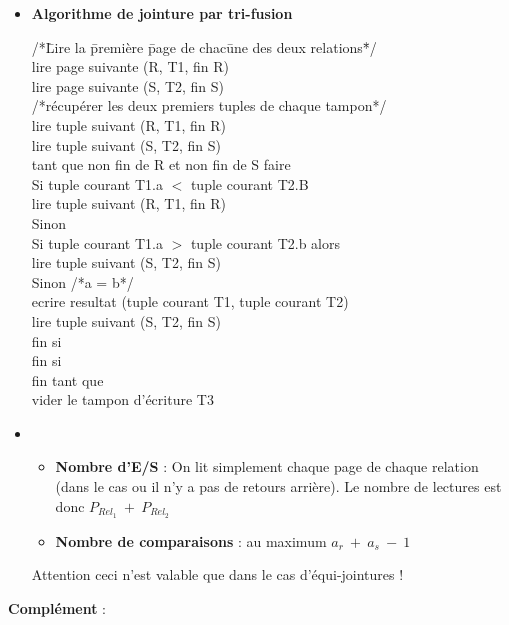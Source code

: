 \documentclass[11pt]{article}
\begin{document}
\begin{itemize}
\item \textbf{Algorithme de jointure par tri-fusion}
\begin{tabbing}
/*\=Lire la \= première \= page de chac\=une des deux relations\=*/\\
\>lire page suivante (R, T1, fin R)\\
\>lire page suivante (S, T2, fin S)\\
/*récupérer les deux premiers tuples de chaque tampon*/\\
\>lire tuple suivant (R, T1, fin R)\\
\>lire tuple suivant (S, T2, fin S)\\
\>tant que non fin de R et non fin de S faire\\
\>\>Si tuple courant T1.a $<$ tuple courant T2.B\\
\>\>\>lire tuple suivant (R, T1, fin R)\\
\>\>Sinon \\
\>\>\>Si tuple courant T1.a $>$ tuple courant T2.b alors\\
\>\>\>\>lire tuple suivant (S, T2, fin S)\\
\>\>\>Sinon /*a = b*/\\
\>\>\>\>ecrire resultat (tuple courant T1, tuple courant T2)\\
\>\>\>\>lire tuple suivant (S, T2, fin S)\\
\>\>\>fin si\\
\>\>fin si\\
\>fin tant que\\
\>vider le tampon d'écriture T3
\end{tabbing}
\item \begin{itemize} \item \textbf{Nombre d'E/S} : On lit simplement chaque page de chaque relation (dans le cas ou il n'y a pas de retours arrière). Le nombre de lectures est donc $\boxed{P_{Rel_1}~+~P_{Rel_2}}$
\item \textbf{Nombre de comparaisons} : au maximum $\boxed{a_r~+~a_s~-~1}$
\end{itemize}
Attention ceci n'est valable que dans le cas d'équi-jointures !
\end{itemize}
\textbf{Complément} : 
\end{document}
